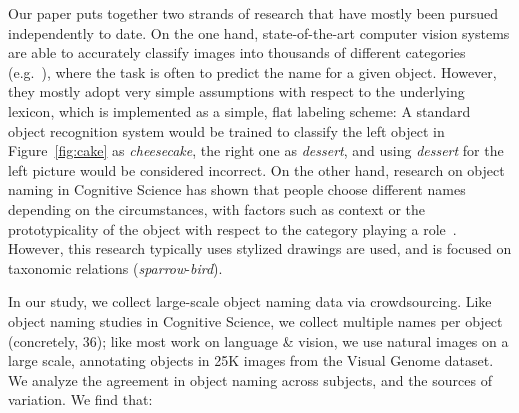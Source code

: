 Our paper puts together two strands of research that have mostly been pursued independently to date.
On the one hand, state-of-the-art computer vision systems are able to accurately classify images into thousands of different categories (e.g.\  ), where the task is often to predict the name for a given object. 
However, they mostly adopt very simple assumptions with respect to the underlying lexicon, which is implemented as a simple, flat labeling scheme: A standard object recognition system would be trained to classify the left object in Figure~\ref{fig:cake} as \emph{cheesecake}, the right one as \emph{dessert}, and using \emph{dessert} for the left picture would be considered incorrect.
On the other hand, research on object naming in Cognitive Science has shown that people choose different names depending on the circumstances, with factors such as context or the prototypicality of the object with respect to the category playing a role~\cite{add-refs}.
However, this research typically uses stylized drawings are used, and is focused on taxonomic relations (\textit{sparrow}-\textit{bird}).



In our study, we collect large-scale object naming data via crowdsourcing.
Like object naming studies in Cognitive Science, we collect multiple names per object (concretely, 36); like most work on language \& vision, we use natural images on a large scale, annotating objects in 25K images from the Visual Genome dataset.
We analyze the agreement in object naming across subjects, and the sources of variation. We find that: 

